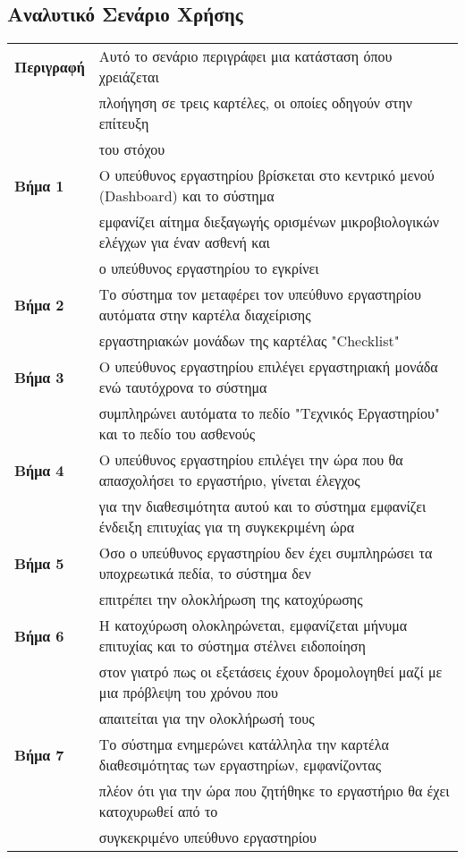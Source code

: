 \documentclass{article}
\newcommand\T{\rule{0pt}{2.6ex}}       %
\newcommand\B{\rule[-1.2ex]{0pt}{0pt}}
\begin{document}
  \subsection{Αναλυτικό Σενάριο Χρήσης}
 
  \begin{center}
     \begin{tabular}{|l|l|}
     \hline
      \textbf{Περιγραφή} & Αυτό το σενάριο περιγράφει μια κατάσταση όπου χρειάζεται \T \\& πλοήγηση σε τρεις καρτέλες, οι οποίες οδηγούν στην επίτευξη \\& του στόχου \B \\ 
      \hline
      \textbf{Βήμα 1} & Ο υπεύθυνος εργαστηρίου βρίσκεται στο κεντρικό μενού (Dashboard) και το σύστημα\T \\& εμφανίζει αίτημα διεξαγωγής ορισμένων μικροβιολογικών ελέγχων για έναν ασθενή και \\& ο υπεύθυνος εργαστηρίου το εγκρίνει \B \\
      \hline
      \textbf{Βήμα 2} & Το σύστημα τον μεταφέρει τον υπεύθυνο εργαστηρίου αυτόματα στην καρτέλα  διαχείρισης \T \\& εργαστηριακών μονάδων της καρτέλας "Checklist"\B \\
      \hline
      \textbf{Βήμα 3} & Ο υπεύθυνος εργαστηρίου επιλέγει εργαστηριακή μονάδα ενώ ταυτόχρονα το σύστημα \T \\& συμπληρώνει αυτόματα το πεδίο "Τεχνικός Εργαστηρίου" και το πεδίο του ασθενούς  \B \\
      \hline
      \textbf{Βήμα 4} & Ο υπεύθυνος εργαστηρίου επιλέγει την ώρα που θα απασχολήσει το εργαστήριο, γίνεται έλεγχος \T\\&  για την διαθεσιμότητα αυτού και το σύστημα εμφανίζει ένδειξη  επιτυχίας για τη συγκεκριμένη ώρα \B\\
      \hline
      \textbf{Βήμα 5} & Όσο ο υπεύθυνος εργαστηρίου δεν έχει συμπληρώσει τα υποχρεωτικά πεδία, το σύστημα δεν \T \\& επιτρέπει την ολοκλήρωση της κατοχύρωσης \B \\
      \hline
      \textbf{Βήμα 6} & H κατοχύρωση ολοκληρώνεται, εμφανίζεται μήνυμα επιτυχίας και το σύστημα στέλνει ειδοποίηση \T \\& στον γιατρό πως οι εξετάσεις έχουν δρομολογηθεί μαζί με μια πρόβλεψη του χρόνου που \\& απαιτείται για την ολοκλήρωσή τους  \B \\
      \hline
      \textbf{Βήμα 7} & Το σύστημα ενημερώνει κατάλληλα την καρτέλα διαθεσιμότητας των εργαστηρίων, εμφανίζοντας\T\\& πλέον ότι για την ώρα που ζητήθηκε το εργαστήριο θα έχει κατοχυρωθεί από το \\&  συγκεκριμένο υπεύθυνο εργαστηρίου\B \\

\end{tabular}
\end{center}
\end{document}
